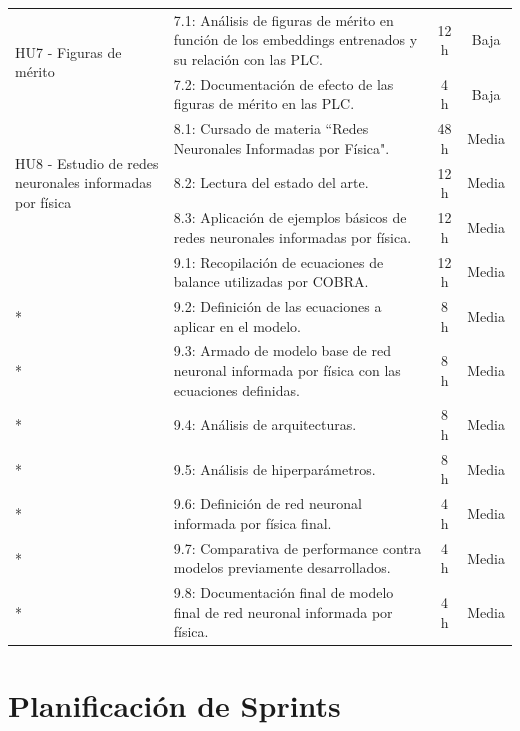 \documentclass[
11pt, %
]{charter}
\begin{document}
\begin{longtable}{|p{4cm}|p{6cm}|c|c|}
\multirow{2}{4cm}{HU7 - Figuras de mérito}  
  & 7.1: Análisis de figuras de mérito en función de los embeddings entrenados y su relación con las PLC. & 12 h & Baja \\* \cline{2-4}
  & 7.2: Documentación de efecto de las figuras de mérito en las PLC. & 4 h & Baja \\ \hline

\multirow{3}{4cm}{HU8 - Estudio de redes neuronales informadas por física}  
  & 8.1: Cursado de materia ``Redes Neuronales Informadas por Física". & 48 h & Media \\* \cline{2-4}
  & 8.2: Lectura del estado del arte. & 12 h & Media \\* \cline{2-4}
  & 8.3: Aplicación de ejemplos básicos de redes neuronales informadas por física. & 12 h & Media \\ \hline

\pagebreak

\multirow{7}{4cm}{HU9 - Implementación de redes neuronales informadas por física}  
  & 9.1: Recopilación de ecuaciones de balance utilizadas por COBRA. & 12 h & Media \\* \cline{2-4}
  & 9.2: Definición de las ecuaciones a aplicar en el modelo. & 8 h & Media \\* \cline{2-4}
  & 9.3: Armado de modelo base de red neuronal informada por física con las ecuaciones definidas. & 8 h & Media \\* \cline{2-4}
  & 9.4: Análisis de arquitecturas. & 8 h & Media \\* \cline{2-4}
  & 9.5: Análisis de hiperparámetros. & 8 h & Media \\* \cline{2-4}
  & 9.6: Definición de red neuronal informada por física final. & 4 h & Media \\* \cline{2-4}
  & 9.7: Comparativa de performance contra modelos previamente desarrollados. & 4 h & Media \\* \cline{2-4}
  & 9.8: Documentación final de modelo final de red neuronal informada por física. & 4 h & Media \\ \hline
\end{longtable}


\newpage
\section{Planificación de Sprints}
\end{document}
